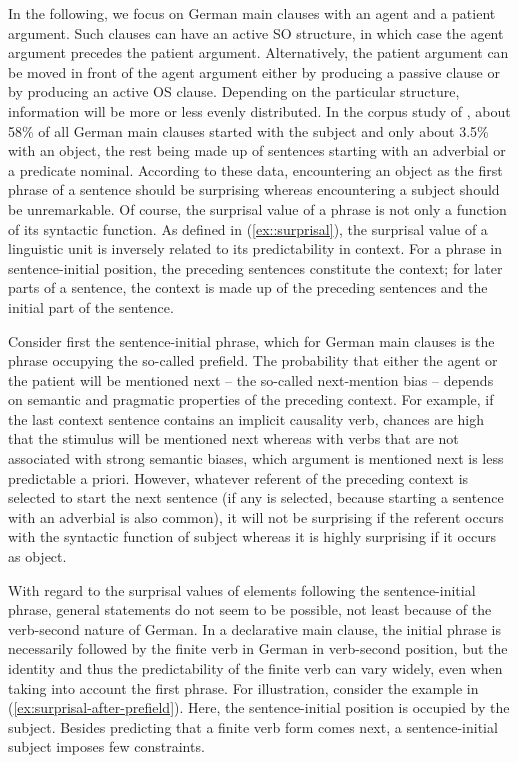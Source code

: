 \documentclass[output=paper,colorlinks,citecolor=brown]{langscibook}
\begin{document}
In the following, we focus on German main clauses with an agent and a patient argument. Such clauses can have an active SO structure, in which case the agent argument precedes the patient argument. Alternatively, the patient argument can be moved in front of the agent argument either by producing a passive clause or by producing an active OS clause. Depending on the particular structure, information will be more or less evenly distributed. In the corpus study of \citet[162]{Hoberg-81-book}, about 58\% of all German main clauses started with the subject and only about 3.5\% with an object, the rest being made up of sentences starting with an adverbial or a predicate nominal. According to these data, encountering an object as the first phrase of a sentence should be surprising whereas encountering a subject should be unremarkable. Of course, the surprisal value of a phrase is not only a function of its syntactic function. As defined in (\ref{ex::surprisal}), the surprisal value of a linguistic unit is inversely related to its predictability in context. For a phrase in sentence-initial position, the preceding sentences constitute the context; for later parts of a sentence, the context is made up of the preceding sentences and the initial part of the sentence. 

Consider first the sentence-initial phrase, which for German main clauses is the phrase occupying the so-called prefield. The probability that either the agent or the patient will be mentioned next -- the so-called next-mention bias -- depends on semantic and pragmatic properties of the preceding context. For example, if the last context sentence contains an implicit causality verb, chances are high that the stimulus will be mentioned next whereas with verbs that are not associated with strong semantic biases, which argument is mentioned next is less predictable a priori. However, whatever referent of the preceding context is selected to start the next sentence (if any is selected, because starting a sentence with an adverbial is also common), it will not be surprising if the referent occurs with the syntactic function of subject whereas it is highly surprising if it occurs as object. 

With regard to the surprisal values of elements following the sentence-initial phrase, general statements do not seem to be possible, not least because of the verb-second nature of German. In a declarative main clause, the initial phrase is necessarily followed by the finite verb in German in verb-second position, but the identity and thus the predictability of the finite verb can vary widely, even when taking into account the first phrase. For illustration, consider the example in (\ref{ex:surprisal-after-prefield}). Here, the sentence-initial position is occupied by the subject. Besides predicting that a finite verb form comes next, a sentence-initial subject imposes few constraints.
\end{document}
